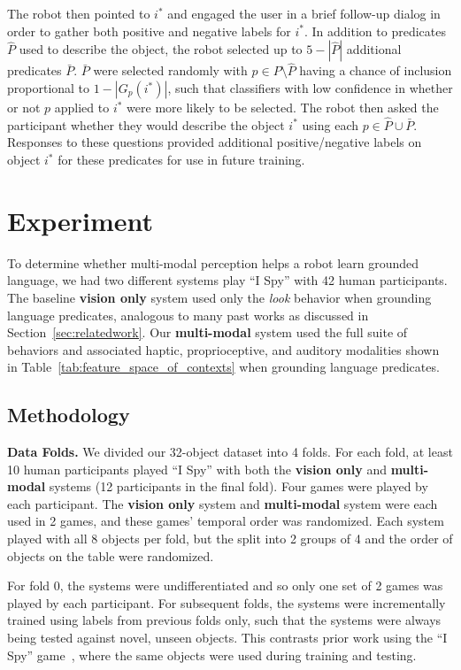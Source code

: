 \documentclass{article}
\newcommand{\ispy}{``I Spy''\xspace}
\begin{document}
The robot then pointed to $i^*$ and engaged the user in a brief follow-up dialog in order to gather both positive and negative labels for $i^*$.
In addition to predicates $\hat{P}$ used to describe the object, the robot selected up to $5-|\hat{P}|$ additional predicates $\bar{P}$.
$\bar{P}$ were selected randomly with $p\in P\setminus\hat{P}$ having a chance of inclusion proportional to $1-|G_p(i^*)|$, such that classifiers with low confidence in whether or not $p$ applied to $i^*$ were more likely to be selected.
The robot then asked the participant whether they would describe the object $i^*$ using each $p\in\hat{P}\cup\bar{P}$.
Responses to these questions provided additional positive/negative labels on object $i^*$ for these predicates for use in future training.


\section{Experiment}
\label{sec:experiment}
To determine whether multi-modal perception helps a robot learn grounded language, we had two different systems play \ispy with 42 human participants.
The baseline \textbf{vision only} system used only the \textit{look} behavior when grounding language predicates, analogous to many past works as discussed in Section~\ref{sec:relatedwork}.
Our \textbf{multi-modal} system used the full suite of behaviors and associated haptic, proprioceptive, and auditory modalities shown in Table~\ref{tab:feature_space_of_contexts} when grounding language predicates.

	\subsection{Methodology}
	\label{ssec:methodology}
\textbf{Data Folds.}
We divided our 32-object dataset into 4 folds.
For each fold, at least 10 human participants played \ispy with both the \textbf{vision only} and \textbf{multi-modal} systems (12 participants in the final fold).
Four games were played by each participant.
The \textbf{vision only} system and \textbf{multi-modal} system were each used in 2 games, and these games' temporal order was randomized.
Each system played with all 8 objects per fold, but the split into 2 groups of 4 and the order of objects on the table were randomized.

For fold 0, the systems were undifferentiated and so only one set of 2 games was played by each participant. 
For subsequent folds, the systems were incrementally trained using labels from previous folds only, such that the systems were always being tested against novel, unseen objects.
This contrasts prior work using the \ispy game~\cite{parde:ijcai15}, where the same objects were used during training and testing.
\end{document}
